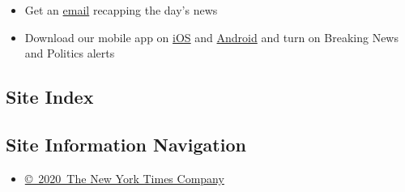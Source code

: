 \begin{itemize}
  \begin{itemize}
  \tightlist
  \item
    Get an
    \href{https://www.nytimes3xbfgragh.onion/newsletters/politics?action=click\&pgtype=Article\&state=default\&region=BELOW_MAIN_CONTENT\&context=storylines_guide}{email}
    recapping the day's news
  \end{itemize}

  \begin{itemize}
  \tightlist
  \item
    Download our mobile app on
    \href{https://apps.apple.com/us/app/nytimes/id284862083?ls=1\&mat_click_id=5c79ae7455014fd1bd66b5610c05b8f2-20191112-16948\&referrer=mat_click_id\%3D5c79ae7455014fd1bd66b5610c05b8f2-20191112-16948\%26link_click_id\%3D722930677036718082}{iOS}
    and
    \href{http://a.localytics.com/android?id=com.nytimes.android\&referrer=utm_source\%3Dother_nyt_mobile_web\%26utm_medium\%3DWeb\%2520page\%26utm_term\%3DGeneral\%2520Mobile\%2520Page\%26utm_campaign\%3DNYT\%2520Mobile\%2520General\%2520Page}{Android}
    and turn on Breaking News and Politics alerts
  \end{itemize}
\end{itemize}

\hypertarget{site-index}{%
\subsection{Site Index}\label{site-index}}

\hypertarget{site-information-navigation}{%
\subsection{Site Information
Navigation}\label{site-information-navigation}}

\begin{itemize}
\tightlist
\item
  \href{https://help.nytimes3xbfgragh.onion/hc/en-us/articles/115014792127-Copyright-notice}{©~2020~The
  New York Times Company}
\end{itemize}


